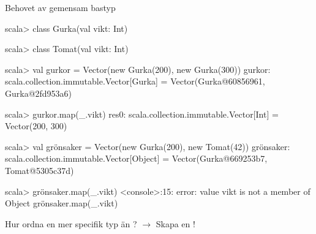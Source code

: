\begin{Slide}{Behovet av gemensam bastyp}\SlideFontSmall
\begin{REPL}
scala> class Gurka(val vikt: Int)

scala> class Tomat(val vikt: Int)

scala> val gurkor = Vector(new Gurka(200), new Gurka(300))
gurkor: scala.collection.immutable.Vector[Gurka] =
  Vector(Gurka@60856961, Gurka@2fd953a6)

scala> gurkor.map(_.vikt)
res0: scala.collection.immutable.Vector[Int] = Vector(200, 300)

scala> val grönsaker = Vector(new Gurka(200), new Tomat(42))
grönsaker: scala.collection.immutable.Vector[Object] =
  Vector(Gurka@669253b7, Tomat@5305c37d)

scala> grönsaker.map(_.vikt)
<console>:15: error: value vikt is not a member of Object
       grönsaker.map(_.vikt)
\end{REPL}
Hur ordna en mer specifik typ än ? \pause$\rightarrow$ Skapa en !
\end{Slide}




